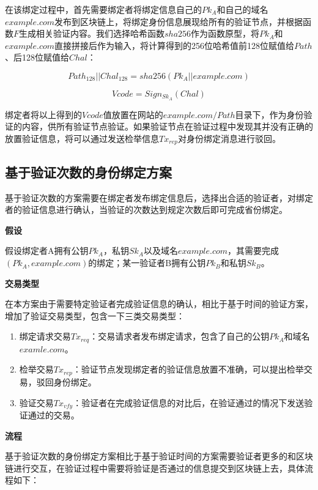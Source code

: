 在该绑定过程中，首先需要绑定者将绑定信息自己的$Pk_A$和自己的域名$example.com$发布到区块链上，将绑定身份信息展现给所有的验证节点，并根据函数$F$生成相关验证内容。我们选择哈希函数$sha256$作为函数原型，将$Pk_A$和$example.com$直接拼接后作为输入，将计算得到的256位哈希值前128位赋值给$Path$、后128位赋值给$Chal$：

\begin{equation}\label{eqF}
Path_{128}||Chal_{128} = sha256(Pk_A||example.com)
\end{equation}

\begin{equation}\label{eqSign}
Vcode = Sign_{Sk_A}(Chal)
\end{equation}

绑定者将以上得到的$Vcode$值放置在网站的$example.com/Path$目录下，作为身份验证的内容，供所有验证节点验证。如果验证节点在验证过程中发现其并没有正确的放置验证信息，将可以通过发送检举信息$Tx_{rep}$对身份绑定消息进行驳回。


\subsection{基于验证次数的身份绑定方案}

基于验证次数的方案需要在绑定者发布绑定信息后，选择出合适的验证者，对绑定者的验证信息进行确认，当验证的次数达到规定次数后即可完成省份绑定。

\noindent\textbf{假设}

假设绑定者A拥有公钥$Pk_A$，私钥$Sk_A$以及域名$example.com$，其需要完成$(Pk_A, example.com)$的绑定；某一验证者B拥有公钥$Pk_B$和私钥$Sk_B$。

\noindent\textbf{交易类型}

在本方案由于需要特定验证者完成验证信息的确认，相比于基于时间的验证方案，增加了验证交易类型，包含一下三类交易类型：

\begin{enumerate}
	\item 绑定请求交易$Tx_{req}$：交易请求者发布绑定请求，包含了自己的公钥$Pk_A$和域名$examle.com$。
	\item 检举交易$Tx_{rep}$：验证节点发现绑定者的验证信息放置不准确，可以提出检举交易，驳回身份绑定。
	\item 验证交易$Tx_{vfy}$：验证者在完成验证信息的对比后，在验证通过的情况下发送验证通过的交易。
\end{enumerate}

\noindent\textbf{流程}

基于验证次数的身份绑定方案相比于基于验证时间的方案需要验证者更多的和区块链进行交互，在验证过程中需要将验证是否通过的信息提交到区块链上去，具体流程如下：

